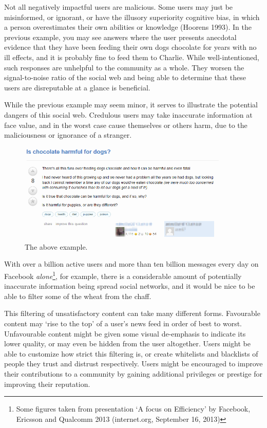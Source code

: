 \documentclass[]{final_report}
\begin{document}
Not all negatively impactful users are malicious. Some users may just be misinformed, or ignorant, or have the illusory superiority cognitive bias, in which a person overestimates their own abilities or knowledge (Hoorens 1993). In the previous example, you may see answers where the user presents anecdotal evidence that they have been feeding their own dogs chocolate for years with no ill effects, and it is probably fine to feed them to Charlie. While well-intentioned, such responses are unhelpful to the community as a whole. They worsen the signal-to-noise ratio of the social web and being able to determine that these users are disreputable at a glance is beneficial.

While the previous example may seem minor, it serves to illustrate the potential dangers of this social web. Credulous users may take inaccurate information at face value, and in the worst case cause themselves or others harm, due to the maliciousness or ignorance of a stranger.

\begin{figure}[ht!]
\centering
\includegraphics[width=100mm]{dog.PNG}
\caption{The above example.}
\end{figure}

With over a billion active users and more than ten billion messages every day on Facebook \textsl{alone}\footnote{Some figures taken from presentation `A focus on Efficiency' by Facebook, Ericsson and Qualcomm 2013 (internet.org, September 16, 2013)}, for example, there is a considerable amount of potentially inaccurate information being spread social networks, and it would be nice to be able to filter some of the wheat from the chaff.

This filtering of unsatisfactory content can take many different forms. Favourable content may `rise to the top' of a user's news feed in order of best to worst. Unfavourable content might be given some visual de-emphasis to indicate its lower quality, or may even be hidden from the user altogether. Users might be able to customize how strict this filtering is, or create whitelists and blacklists of people they trust and distrust respectively. Users might be encouraged to improve their contributions to a community by gaining additional privileges or prestige for improving their reputation.
\end{document}

